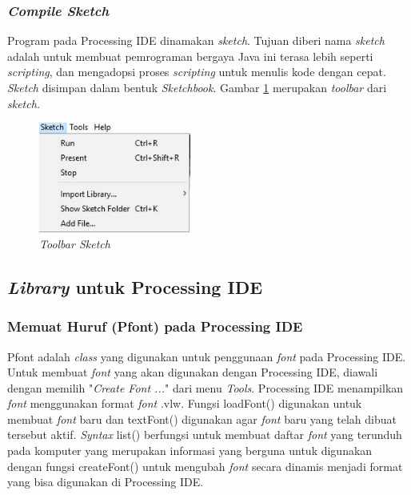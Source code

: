 \subsubsection{ \textit{Compile Sketch} }
Program pada Processing IDE dinamakan \textit{sketch}. Tujuan diberi nama \textit{sketch} adalah untuk membuat pemrograman bergaya Java ini terasa lebih seperti \textit{scripting}, dan mengadopsi proses \textit{scripting} untuk menulis kode dengan cepat. \textit{Sketch} disimpan dalam bentuk \textit{Sketchbook}. Gambar \ref{pic.toolbarsketch} merupakan \textit{toolbar} dari \textit{sketch.}

\begin{figure}[H]
	\centering
	\includegraphics[width=5cm]{gambar/compile.jpg}
	\caption{\textit{Toolbar Sketch}}
	\label{pic.toolbarsketch}
\end{figure}

\subsection{ \textit{Library} untuk Processing IDE }
\subsubsection{ Memuat Huruf (Pfont) pada Processing IDE }
Pfont adalah \textit{class} yang digunakan untuk penggunaan \textit{font} pada Processing IDE. Untuk membuat \textit{font} yang akan digunakan dengan Processing IDE, diawali dengan memilih "\textit{Create Font ...}" dari menu \textit{Tools}. Processing IDE menampilkan \textit{font} menggunakan format \textit{font} .vlw. Fungsi loadFont() digunakan untuk membuat \textit{font} baru dan textFont() digunakan agar \textit{font} baru yang telah dibuat tersebut aktif. \textit{Syntax} list() berfungsi untuk membuat daftar \textit{font} yang terunduh pada komputer yang merupakan informasi yang berguna untuk digunakan dengan fungsi createFont() untuk mengubah \textit{font} secara dinamis menjadi format yang bisa digunakan di Processing IDE. 



